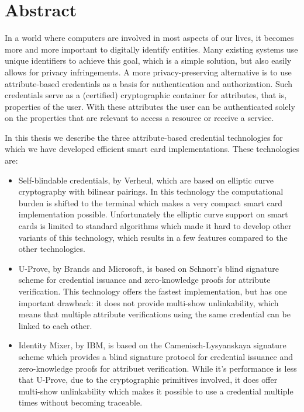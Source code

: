 \chapter*{Abstract}

In a world where computers are involved in most aspects of our lives, it
becomes more and more important to digitally identify entities. Many
existing systems use unique identifiers to achieve this goal, which is a
simple solution, but also easily allows for privacy infringements. A
more privacy-preserving alternative is to use attribute-based
credentials as a basis for authentication and authorization. Such
credentials serve as a (certified) cryptographic container for
attributes, that is, properties of the user. With these attributes the
user can be authenticated  solely on the properties that are relevant to
access a resource or receive a service.

In this thesis we describe the three attribute-based credential
technologies for which we have developed efficient smart card
implementations. These technologies are:
\begin{itemize}
  \item Self-blindable credentials, by Verheul, which are based on elliptic
   curve cryptography with bilinear pairings. In this technology the
   computational burden is shifted to the terminal which makes a very
   compact smart card implementation possible. Unfortunately the
   elliptic curve support on smart cards is limited to standard
   algorithms which made it hard to develop other variants of this
   technology, which results in a few features compared to the other
   technologies.

  \item U-Prove, by Brands and Microsoft, is based on Schnorr's blind
   signature scheme for credential issuance and zero-knowledge proofs
   for attribute verification. This technology offers the fastest
   implementation, but has one important drawback: it does not provide
   multi-show unlinkability, which means that multiple attribute
   verifications using the same credential can be linked to each other.

  \item Identity Mixer, by IBM, is based on the Camenisch-Lysyanskaya
   signature scheme which provides a blind signature protocol for
   credential issuance and zero-knowledge proofs for attribuet
   verification. While it's performance is less that U-Prove, due to
   the cryptographic primitives involved, it does offer multi-show
   unlinkability which makes it possible to use a credential multiple
   times without becoming traceable.
\end{itemize}

